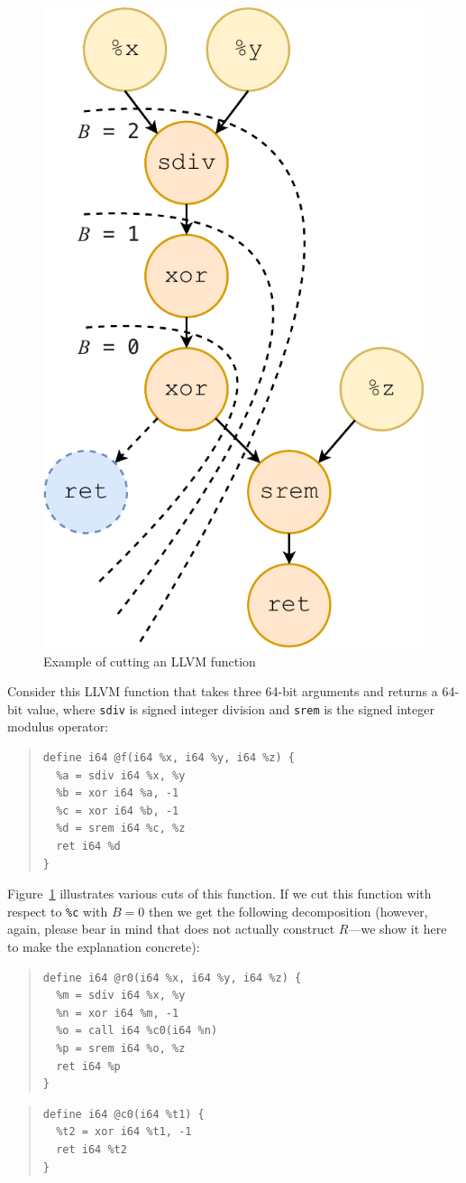 \begin{figure}
  \centering
  \includegraphics[width=0.5\linewidth]{figures/cut-depth.pdf}
  \caption{Example of cutting an LLVM function}
  \label{fig:cut-depth}
\end{figure}

Consider this LLVM function that takes three 64-bit arguments and
returns a 64-bit value, where \texttt{sdiv} is signed integer division
and \texttt{srem} is the signed integer modulus operator:


{\small\begin{quote}
\begin{verbatim}
define i64 @f(i64 %x, i64 %y, i64 %z) {
  %a = sdiv i64 %x, %y
  %b = xor i64 %a, -1
  %c = xor i64 %b, -1
  %d = srem i64 %c, %z
  ret i64 %d
}
\end{verbatim}
\end{quote}}

Figure~\ref{fig:cut-depth} illustrates various cuts of this function.
%
If we cut this function with respect to \texttt{\%c} with $B = 0$ then
we get the following decomposition (however, again, please bear in
mind that \minotaur{} does not actually construct $R$---we show it here to
make the explanation concrete):

\begin{multicols}{2}
{\small\begin{quote}
\begin{verbatim}
define i64 @r0(i64 %x, i64 %y, i64 %z) {
  %m = sdiv i64 %x, %y
  %n = xor i64 %m, -1
  %o = call i64 %c0(i64 %n)
  %p = srem i64 %o, %z
  ret i64 %p
}
\end{verbatim}
\end{quote}}
\columnbreak
{\small\begin{quote}
\begin{verbatim}
define i64 @c0(i64 %t1) {
  %t2 = xor i64 %t1, -1
  ret i64 %t2
}
\end{verbatim}
\end{quote}}
\end{multicols}

